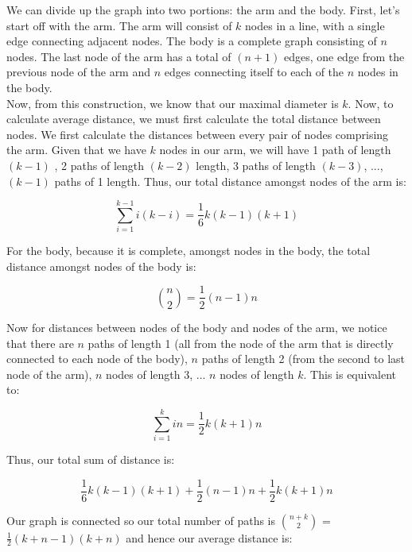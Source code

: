 \documentclass[12 pt]{article}
\begin{document}
	\noindent We can divide up the graph into two portions: the arm and the body. First, let's start off with the arm. The arm will consist of $k$ nodes in a line, with a single edge connecting adjacent nodes. The body is a complete graph consisting of $n$ nodes. The last node of the arm has a total of $(n+1)$ edges, one edge from the previous node of the arm and $n$ edges connecting itself to each of the $n$ nodes in the body. \\
	
	\noindent Now, from this construction, we know that our maximal diameter is $k$. Now, to calculate average distance, we must first calculate the total distance between nodes. We first calculate the distances between every pair of nodes comprising the arm. Given that we have $k$ nodes in our arm, we will have 1 path of length $(k-1)$ , 2 paths of length $(k-2)$ length, 3 paths of length $(k-3)$, ...,  $(k-1)$ paths of 1 length. Thus, our total distance amongst nodes of the arm is:
	
	\begin{equation}
	\sum_{i=1}^{k-1} i (k-i) = \frac{1}{6} k(k-1)(k+1)
	\end{equation} 
	
	\noindent For the body, because it is complete, amongst nodes in the body, the total distance amongst nodes of the body is:
	
	\begin{equation}
	\binom{n}{2} = \frac{1}{2}(n-1)n
	\end{equation}
	
	\noindent Now for distances between nodes of the body and nodes of the arm, we notice that there are $n$ paths of length 1 (all from the node of the arm that is directly connected to each node of the body), $n$ paths of length 2 (from the second to last node of the arm), $n$ nodes of length 3, ... $n$ nodes of length $k$. This is equivalent to:
	
	\begin{equation}
		\sum_{i=1}^{k} in = \frac{1}{2} k(k+1)n
	\end{equation}
	
	\noindent Thus, our total sum of distance is: 
	
	\begin{equation}
	\frac{1}{6} k(k-1)(k+1) + \frac{1}{2}(n-1)n + \frac{1}{2} k(k+1)n 
	\end{equation}
	
	\noindent Our graph is connected so our total number of paths is $n+k\choose 2$ = $\frac{1}{2}(k+n-1)(k+n)$ and hence our average distance is:
	
\end{document}
